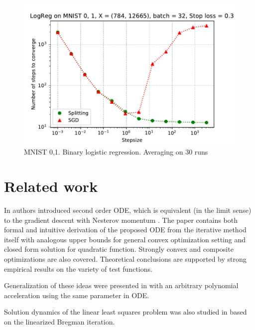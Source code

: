\documentclass{article}
\begin{document}
\begin{figure}[ht]
\vskip 0.2in
\begin{center}
\centerline{\includegraphics[width=\columnwidth]{sgd_split_time_logreg.pdf}}
\caption{MNIST 0,1. Binary logistic regression. Averaging on 30 runs}
\label{strang:fig:logreg_step_time}
\end{center}
\vskip -0.2in
\end{figure}


\section{Related work}

In \cite{su2014differential} authors introduced second order ODE, which is equivalent (in the limit sense) to the gradient descent with Nesterov momentum \cite{nesterov1983method}. The paper contains both formal and intuitive derivation of the proposed ODE from the iterative method itself with analogous upper bounds for general convex optimization setting and closed form solution for quadratic function. Strongly convex and composite optimizations are also covered. Theoretical conclusions are supported by strong empirical results on the variety of test functions.

Generalization of these ideas were presented in \cite{wibisono2016variational} with an arbitrary polynomial acceleration using the same parameter in ODE.

Solution dynamics of the linear least squares problem was also studied in \cite{osher2016sparse} based on the linearized Bregman iteration.
\end{document}
